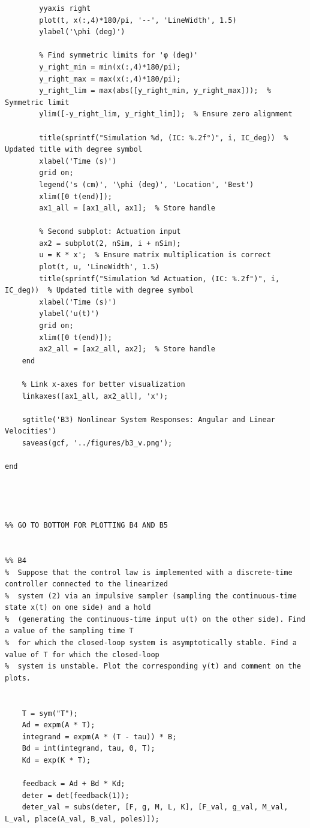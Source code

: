 \documentclass{article}
\begin{document}
\begin{verbatim}
        yyaxis right
        plot(t, x(:,4)*180/pi, '--', 'LineWidth', 1.5)
        ylabel('\phi (deg)')
    
        % Find symmetric limits for 'φ (deg)'
        y_right_min = min(x(:,4)*180/pi);
        y_right_max = max(x(:,4)*180/pi);
        y_right_lim = max(abs([y_right_min, y_right_max]));  % Symmetric limit
        ylim([-y_right_lim, y_right_lim]);  % Ensure zero alignment
    
        title(sprintf("Simulation %d, (IC: %.2f°)", i, IC_deg))  % Updated title with degree symbol
        xlabel('Time (s)')
        grid on;
        legend('s (cm)', '\phi (deg)', 'Location', 'Best')
        xlim([0 t(end)]); 
        ax1_all = [ax1_all, ax1];  % Store handle
    
        % Second subplot: Actuation input
        ax2 = subplot(2, nSim, i + nSim);
        u = K * x';  % Ensure matrix multiplication is correct
        plot(t, u, 'LineWidth', 1.5)
        title(sprintf("Simulation %d Actuation, (IC: %.2f°)", i, IC_deg))  % Updated title with degree symbol
        xlabel('Time (s)')
        ylabel('u(t)')
        grid on;
        xlim([0 t(end)]);
        ax2_all = [ax2_all, ax2];  % Store handle
    end
    
    % Link x-axes for better visualization
    linkaxes([ax1_all, ax2_all], 'x');

    sgtitle('B3) Nonlinear System Responses: Angular and Linear Velocities')
    saveas(gcf, '../figures/b3_v.png');

end




%% GO TO BOTTOM FOR PLOTTING B4 AND B5


%% B4
%  Suppose that the control law is implemented with a discrete-time controller connected to the linearized
%  system (2) via an impulsive sampler (sampling the continuous-time state x(t) on one side) and a hold
%  (generating the continuous-time input u(t) on the other side). Find a value of the sampling time T
%  for which the closed-loop system is asymptotically stable. Find a value of T for which the closed-loop
%  system is unstable. Plot the corresponding y(t) and comment on the plots.


    T = sym("T");
    Ad = expm(A * T);
    integrand = expm(A * (T - tau)) * B;
    Bd = int(integrand, tau, 0, T);
    Kd = exp(K * T);
    
    feedback = Ad + Bd * Kd;
    deter = det(feedback(1));
    deter_val = subs(deter, [F, g, M, L, K], [F_val, g_val, M_val, L_val, place(A_val, B_val, poles)]);


\end{verbatim}
\end{document}
